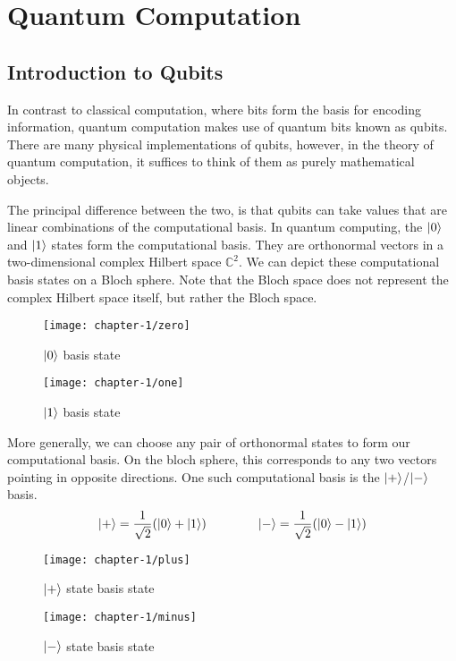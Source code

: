 \section{Quantum Computation}

\subsection{Introduction to Qubits}

In contrast to classical computation, where bits form the basis for encoding information, quantum computation makes use of quantum bits known as qubits. There are many physical implementations of qubits, however, in the theory of quantum computation, it suffices to think of them as purely mathematical objects.

The principal difference between the two, is that qubits can take values that are linear combinations of the computational basis. In quantum computing, the $\ket 0$ and $\ket 1$ states form the computational basis. They are orthonormal vectors in a two-dimensional complex Hilbert space $\mathbb{C}^2$. We can depict these computational basis states on a Bloch sphere. Note that the Bloch space does not represent the complex Hilbert space itself, but rather the Bloch space.
\begin{figure}[H]
\centering
    \begin{minipage}{.4\textwidth}
      \centering
      \texttt{[image: chapter-1/zero]}
      \caption{$\ket 0$ basis state}
    \end{minipage}%
    \begin{minipage}{.4\textwidth}
      \centering
      \texttt{[image: chapter-1/one]}
      \caption{$\ket 1$ basis state}
    \end{minipage}
\end{figure}

More generally, we can choose any pair of orthonormal states to form our computational basis. On the bloch sphere, this corresponds to any two vectors pointing in opposite directions. One such computational basis is the $\ket +$/$\ket -$ basis.
\begin{equation*}
\begin{gathered}
    \ket + = \frac{1}{\sqrt{2}} (\ket 0 + \ket 1) \qquad\qquad
    \ket - = \frac{1}{\sqrt{2}} (\ket 0 - \ket 1)
\end{gathered}
\end{equation*}

\begin{figure}[H]
\centering
    \begin{minipage}{.4\textwidth}
      \centering
      \texttt{[image: chapter-1/plus]}
      \caption{$\ket +$ state basis state}
    \end{minipage}%
    \begin{minipage}{.4\textwidth}
      \centering
      \texttt{[image: chapter-1/minus]}
      \caption{$\ket -$ state basis state}
    \end{minipage}
\end{figure}


